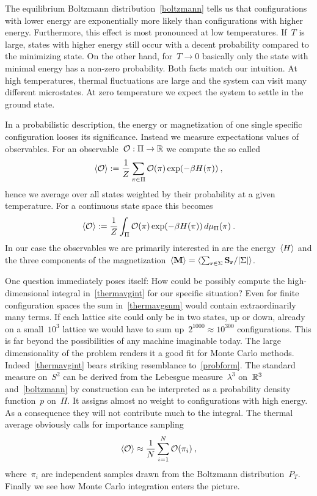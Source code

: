 The equilibrium Boltzmann distribution~\eqref{boltzmann} tells us that
configurations with lower energy are exponentially more likely than
configurations with higher energy. Furthermore, this effect is most pronounced
at low temperatures. If~$T$ is large, states with higher energy still occur with
a decent probability compared to the minimizing state. On the other hand, for~$T
\to 0$ basically only the state with minimal energy has a non-zero probability.
Both facts match our intuition. At high temperatures, thermal fluctuations are
large and the system can visit many different microstates. At zero temperature
we expect the system to settle in the ground state.

In a probabilistic description, the energy or magnetization of one single
specific configuration looses its significance. Instead we measure expectations
values of observables. For an observable~${\mathcal{O}}:{\Pi}\to{\mathbb{R}}$ we compute the so
called 
%
\begin{equation}\label{thermavgsum}
  \langle \mathcal{O} \rangle := \frac{1}{Z} \sum_{\pi \in \Pi} \mathcal{O}(\pi) \exp(- \beta H(\pi))\:,
\end{equation}
%
hence we average over all states weighted by their probability at a given
temperature. For a continuous state space this becomes
%
\begin{equation}\label{thermavgint}
  \langle \mathcal{O} \rangle := \frac{1}{Z} \int_{\Pi} \mathcal{O}(\pi) \exp(- \beta H(\pi))
    \,d\mu_{\Pi}(\pi)\:.
\end{equation}
%
In our case the observables we are primarily interested in are the
energy~$\langle H \rangle$ and the three components of the magnetization~$\avg{\M} =
\avg{\sum_{\r \in \Sigma} \S_{\r} / \abs{\Sigma}}$.

One question immediately poses itself: How could be possibly compute the
high-dimensional integral in~\eqref{thermavgint} for our specific situation?
Even for finite configuration spaces the sum in~\eqref{thermavgsum} would
contain extraordinarily many terms. If each lattice site could only be in two
states, up or down, already on a small~$10^3$ lattice we would have to sum
up~$2^{1000} \approx 10^{300}$ configurations. This is far beyond the
possibilities of any machine imaginable today. The large dimensionality of the
problem renders it a good fit for Monte Carlo methods.
Indeed~\eqref{thermavgint} bears striking resemblance to~\eqref{probform}. The
standard measure on~$S^2$ can be derived from the Lebesgue measure~$\lambda^3$
on~$\mathbb{R}^3$ and~\eqref{boltzmann} by construction can be interpreted as a
probability density function~$p$ on~$\Pi$. It assigns almost no weight to
configurations with high energy. As a consequence they will not contribute much
to the integral. The thermal average obviously calls for importance sampling
%
\begin{equation}\label{thermavgapprox}
  \langle \mathcal{O} \rangle \approx \frac{1}{N} \sum_{i = 1}^N \mathcal{O}(\pi_i)\:,
\end{equation}
%
where~$\pi_i$ are independent samples drawn from the Boltzmann
distribution~$P_T$. Finally we see how Monte Carlo integration enters the
picture.

